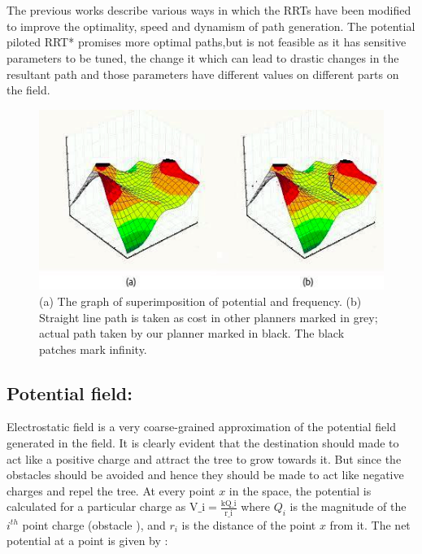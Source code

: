 \documentclass[runningheads]{llncs}
\begin{document}
\section{}
\vspace{-1mm}
The previous works describe various ways in which the RRTs have been modified to improve the optimality, speed and dynamism of path generation. The potential piloted RRT* promises more optimal paths,but is not feasible as it has sensitive parameters to be tuned, the change it which can lead to drastic changes in the resultant path and those parameters have different values on different parts on the field.

\begin{figure}
\begin{center}
\includegraphics[scale=0.8]{images2_tog_new2.png}
    \caption{(a) The graph of superimposition of potential and frequency. (b) Straight line path is taken as cost in other planners marked in grey; actual path taken by our planner marked in black. The black patches mark infinity.} \label{fig1}
\end{center}
\end{figure}

\subsection{Potential field:}
Electrostatic field is a very  coarse-grained approximation of the potential field generated in the field. It is clearly evident that the destination should made to act like a positive charge and attract the tree to grow towards it. But since the obstacles should be avoided and hence they should be made to act like negative charges and repel the tree. At every point $x$ in the space, the potential is calculated for a particular charge as $\text{V_{i}}=\frac{\text{kQ_{i}}}{\text{r_{i}}}$ where $Q_{i}$ is the magnitude of the $i^{th}$ point charge (obstacle ), and $r_{i}$ is the distance of the point $x$ from it. The net potential at a point is given by :
\end{document}
